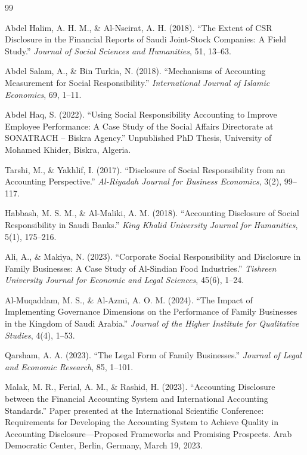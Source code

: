 \documentclass[10pt]{NSP1}
\begin{document}
\begin{thebibliography}{99}

Abdel Halim, A. H. M., \& Al-Nseirat, A. H. (2018). ``The Extent of CSR Disclosure in the Financial Reports of Saudi Joint-Stock Companies: A Field Study.'' \emph{Journal of Social Sciences and Humanities}, 51, 13--63.

Abdel Salam, A., \& Bin Turkia, N. (2018). ``Mechanisms of Accounting Measurement for Social Responsibility.'' \emph{International Journal of Islamic Economics}, 69, 1--11.

Abdel Haq, S. (2022). ``Using Social Responsibility Accounting to Improve Employee Performance: A Case Study of the Social Affairs Directorate at SONATRACH -- Biskra Agency.'' Unpublished PhD Thesis, University of Mohamed Khider, Biskra, Algeria.

Tarshi, M., \& Yakhlif, I. (2017). ``Disclosure of Social Responsibility from an Accounting Perspective.'' \emph{Al-Riyadah Journal for Business Economics}, 3(2), 99--117.

Habbash, M. S. M., \& Al-Maliki, A. M. (2018). ``Accounting Disclosure of Social Responsibility in Saudi Banks.'' \emph{King Khalid University Journal for Humanities}, 5(1), 175--216.

Ali, A., \& Makiya, N. (2023). ``Corporate Social Responsibility and Disclosure in Family Businesses: A Case Study of Al-Sindian Food Industries.'' \emph{Tishreen University Journal for Economic and Legal Sciences}, 45(6), 1--24.

Al-Muqaddam, M. S., \& Al-Azmi, A. O. M. (2024). ``The Impact of Implementing Governance Dimensions on the Performance of Family Businesses in the Kingdom of Saudi Arabia.'' \emph{Journal of the Higher Institute for Qualitative Studies}, 4(4), 1--53.

Qarsham, A. A. (2023). ``The Legal Form of Family Businesses.'' \emph{Journal of Legal and Economic Research}, 85, 1--101.

Malak, M. R., Ferial, A. M., \& Rashid, H. (2023). ``Accounting Disclosure between the Financial Accounting System and International Accounting Standards.'' Paper presented at the International Scientific Conference: Requirements for Developing the Accounting System to Achieve Quality in Accounting Disclosure---Proposed Frameworks and Promising Prospects. Arab Democratic Center, Berlin, Germany, March 19, 2023.


\end{thebibliography}
\end{document}
